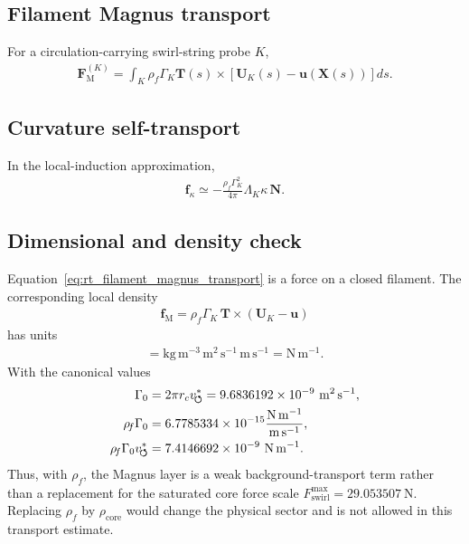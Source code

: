 \subsection{Filament Magnus transport}
    For a circulation-carrying swirl-string probe $K$,
    \begin{align}
        \mathbf{F}_{\mathrm{M}}^{(K)}
        =
        \int_K
        \rho_{\!f}\Gamma_K
        \mathbf{T}(s)\times
        \left[
            \mathbf{U}_K(s)-\mathbf{u}(\mathbf{X}(s))
        \right]ds.
        \label{eq:rt_filament_magnus_transport}
    \end{align}

\subsection{Curvature self-transport}
    In the local-induction approximation,
    \begin{align}
        \mathbf{f}_{\kappa}
        \simeq
        -\frac{\rho_{\!f}\Gamma_K^2}{4\pi}
        \Lambda_K\kappa\,\mathbf{N}.
        \label{eq:rt_curvature_self_transport}
    \end{align}

\subsection{Dimensional and density check}
    Equation~\eqref{eq:rt_filament_magnus_transport} is a force on a closed
    filament. The corresponding local density
    \begin{align}
        \mathbf{f}_{\mathrm{M}}
        =
        \rho_{\!f}\Gamma_K\,
        \mathbf{T}\times(\mathbf{U}_K-\mathbf{u})
    \end{align}
    has units
    \begin{align}
        [\rho_{\!f}\Gamma_K\Delta U]
        =
        \mathrm{kg\,m^{-3}}\,\mathrm{m^2\,s^{-1}}\,\mathrm{m\,s^{-1}}
        =
        \mathrm{N\,m^{-1}}.
    \end{align}
    With the canonical values
    \begin{align}
        \Gamma_0
        &=
        2\pi r_cv_{\!\boldsymbol{\circlearrowleft}}^{\ast}
        =
        9.6836192\times10^{-9}\ \mathrm{m^2\,s^{-1}},\\
        \rho_{\!f}\Gamma_0
        &=
        6.7785334\times10^{-15}
        \frac{\mathrm{N\,m^{-1}}}{\mathrm{m\,s^{-1}}},\\
        \rho_{\!f}\Gamma_0v_{\!\boldsymbol{\circlearrowleft}}^{\ast}
        &=
        7.4146692\times10^{-9}\ \mathrm{N\,m^{-1}}.
    \end{align}
    Thus, with \(\rho_{\!f}\), the Magnus layer is a weak background-transport
    term rather than a replacement for the saturated core force scale
    \(F_{\mathrm{swirl}}^{\max}=29.053507\ \mathrm{N}\). Replacing
    \(\rho_{\!f}\) by \(\rho_{\mathrm{core}}\) would change the physical sector and
    is not allowed in this transport estimate.

